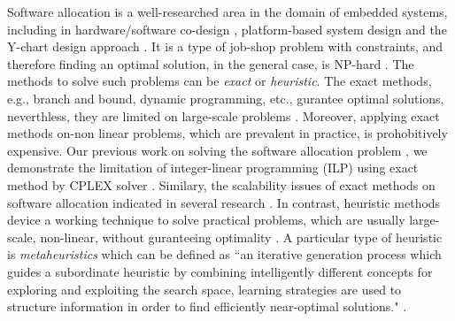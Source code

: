 Software allocation is a well-researched area in the domain of embedded systems, including in hardware/software co-design \cite{Wolf2003ACodesign}, platform-based system design \cite{Sangiovanni-Vincentelli2004BenefitsDesign} and the Y-chart design approach \cite{ychart_Kienhuis2002}. It is a type of job-shop problem with constraints, and therefore finding an optimal solution, in the general case, is  NP-hard \cite{Fernandez-Baca1989AllocatingSystem}. The methods to solve such problems can be \textit{exact} or \textit{heuristic}. The exact methods, e.g., branch and bound, dynamic programming, etc., gurantee optimal solutions, neverthless, they are limited on large-scale problems \cite{Saidi2015AnArchitectures}. Moreover, applying exact methods on-non linear problems, which are prevalent in practice, is prohobitively expensive. Our previous work on solving the software allocation problem \cite{Mahmud5222}, we demonstrate the limitation of integer-linear programming (ILP) \cite{Bradley1977AppliedProgramming} using exact method by CPLEX solver . Similary, the scalability issues of exact methods on software allocation indicated in several research \cite{Saidi2015AnArchitectures}. In contrast, heuristic methods device a working technique to solve practical problems, which are usually large-scale, non-linear, without guranteeing optimality \cite{faragardi2018AECUs,Bucaioni2018MoVES:Systems}.  A particular type of heuristic is \textit{metaheuristics} which can be defined as ``an iterative generation process which guides a subordinate heuristic by combining intelligently different concepts for exploring and exploiting the search space, learning strategies are used to structure information in order to
find efficiently near-optimal solutions." \cite{Osman2005}.


